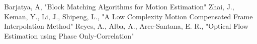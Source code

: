 \begin{thebibliography}{9}
Barjatya, A, "Block Matching Algorithms for Motion Estimation"
Zhai, J., Keman, Y., Li, J., Shipeng, L., "A Low Complexity Motion Compensated Frame Interpolation Method"
Reyes, A., Alba, A., Arce-Santana, E. R., "Optical Flow Estimation using Phase Only-Correlation"
\end{thebibliography}